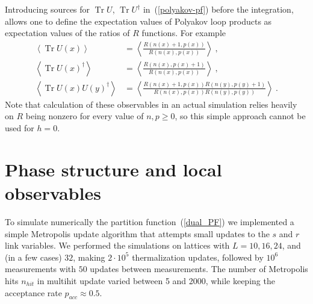 \documentclass[a4paper,11pt]{article}
\DeclareMathOperator{\TR}{Tr}
\begin{document}
Introducing sources for $\TR U$, $\TR U^\dagger$ in~(\ref{polyakov-pf}) before the integration, allows one 
to define the expectation values of Polyakov loop products as
expectation values of the ratios of $R$ functions. For example
\begin{align}
    \left\langle \TR U(x) \right\rangle &=
    \left\langle \frac{R(n(x) + 1, p(x))}{R(n(x), p(x))} \right\rangle \ , \\
    \left\langle \TR U(x)^\dagger \right\rangle &=
    \left\langle \frac{R(n(x), p(x) + 1)}{R(n(x), p(x))} \right\rangle \ , \\
    \left\langle \TR U(x) U(y)^\dagger \right\rangle &=
    \left\langle \frac{R(n(x) + 1, p(x)) R(n(y), p(y) + 1)}{R(n(x), p(x)) R(n(y), p(y))} \right\rangle \ .
\end{align}
Note that calculation of these observables in an actual simulation relies heavily on $R$ being nonzero for every value of 
$n, p \geq 0$, so this simple approach cannot be used for
$h = 0$.

\section{Phase structure and local observables}

To simulate numerically the partition function~(\ref{dual_PF}) we implemented a simple Metropolis update algorithm that attempts small updates to the $s$ and $r$ link variables. 
We performed the simulations on lattices with $L = 10, 16, 24$, and (in a few cases) $32$, making $2\cdot 10^5$ thermalization updates, followed by $10^6$ measurements with $50$ updates between measurements. The number of Metropolis hits $n_{hit}$ in multihit update varied between 5 and 2000, while keeping the acceptance rate $p_{acc} \approx 0.5$.
\end{document}
